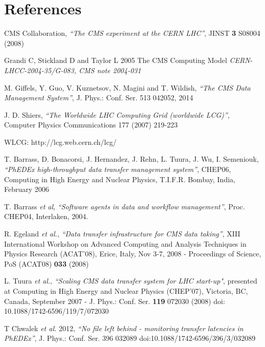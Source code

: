 \section*{References}

\begin{thebibliography}{1}

  CMS Collaboration, {\it ``The CMS experiment at the CERN LHC''}, JINST \textbf{3} S08004 (2008)

  Grandi C, Stickland D and Taylor L 2005 The CMS Computing Model {\it CERN-LHCC-2004-35/G-083, CMS note 2004-031}

  M. Giffels, Y. Guo, V. Kuznetsov, N. Magini and T. Wildish, {\it ``The CMS
  Data Management System''}, J. Phys.: Conf. Ser. 513 042052, 2014

  J. D. Shiers, {\it ``The Worldwide LHC Computing Grid (worldwide LCG)''},
Computer Physics Communications 177 (2007) 219-223

  WLCG: http://lcg.web.cern.ch/lcg/

  T. Barrass, D. Bonacorsi, J. Hernandez, J. Rehn, L. Tuura, J. Wu,
  I. Semeniouk, {\it ``PhEDEx high-throughput data transfer management
  system''}, CHEP06, Computing in High Energy and Nuclear Physics,
  T.I.F.R.  Bombay, India, February 2006

  T. Barrass {\it et al}, {\it ``Software agents in data and workflow
    management''}, Proc. CHEP04, Interlaken, 2004.

  R. Egeland {\it et al.}, {\it ``Data transfer infrastructure for CMS
    data taking''}, XIII International Workshop on Advanced Computing
  and Analysis Techniques in Physics Research (ACAT'08), Erice, Italy,
  Nov 3-7, 2008 - Proceedings of Science, PoS (ACAT08) \textbf{033} (2008)

  L. Tuura {\it et al.}, {\it ``Scaling CMS data transfer system for
    LHC start-up"}, presented at Computing in High Energy and Nuclear
  Physics (CHEP'07), Victoria, BC, Canada, September 2007 - J. Phys.:
  Conf. Ser. \textbf{119} 072030 (2008) doi: 10.1088/1742-6596/119/7/072030

T Chwalek {\it et al.} 2012, {\it ``No file left behind - monitoring
  transfer latencies in PhEDEx''}, J. Phys.: Conf. Ser. 396 032089
doi:10.1088/1742-6596/396/3/032089

\end{thebibliography}
